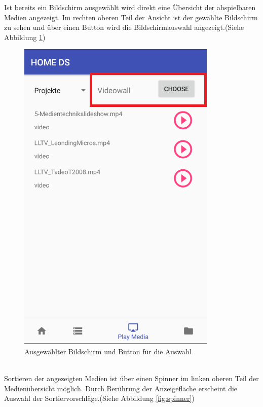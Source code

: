 Ist bereits ein Bildschirm ausgewählt wird direkt eine Übersicht der abspielbaren Medien angezeigt. Im rechten oberen Teil der Ansicht ist der gewählte Bildschirm zu sehen und über einen Button wird die Bildschirmauswahl angezeigt.(Siehe Abbildung \ref{fig:mediaOv})
\begin{figure}[H]
\centering
\includegraphics[scale=0.35]{images/06_AndroidApp/06_displayTextAndButton}
\caption{Ausgewählter Bildschirm und Button für die Auswahl}
\label{fig:mediaOv}
\end{figure}
\\
Sortieren der angezeigten Medien ist über einen Spinner im linken oberen Teil der Medienübersicht möglich. Durch Berührung der Anzeigefläche erscheint die Auswahl der Sortiervorschläge.(Siehe Abbildung \ref{fig:spinner})

